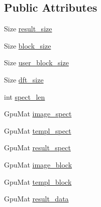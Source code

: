 \subsection*{Public Attributes}
\begin{DoxyCompactItemize}
\item 
Size \hyperlink{structcv_1_1gpu_1_1ConvolveBuf_a1fcc3ca5bfa580528118ce922b3692b7}{result\-\_\-size}
\item 
Size \hyperlink{structcv_1_1gpu_1_1ConvolveBuf_a6aef44d6f244fddaf0af4200872deacc}{block\-\_\-size}
\item 
Size \hyperlink{structcv_1_1gpu_1_1ConvolveBuf_ade057847a290ec2248bd3b2cfca3d917}{user\-\_\-block\-\_\-size}
\item 
Size \hyperlink{structcv_1_1gpu_1_1ConvolveBuf_a5593bfd0e5bd9eb4f72a3c97a77a2c63}{dft\-\_\-size}
\item 
int \hyperlink{structcv_1_1gpu_1_1ConvolveBuf_a300e36466a351f57ac879152dc38b7e0}{spect\-\_\-len}
\item 
Gpu\-Mat \hyperlink{structcv_1_1gpu_1_1ConvolveBuf_a08ae7b923567201abe7738707784961c}{image\-\_\-spect}
\item 
Gpu\-Mat \hyperlink{structcv_1_1gpu_1_1ConvolveBuf_a35ceeee1b84fbde044e518ea5237ad97}{templ\-\_\-spect}
\item 
Gpu\-Mat \hyperlink{structcv_1_1gpu_1_1ConvolveBuf_a0b81e80891c9833a4f41a62e0fff62c2}{result\-\_\-spect}
\item 
Gpu\-Mat \hyperlink{structcv_1_1gpu_1_1ConvolveBuf_a633f154c0c1bbab45bd85ec46a4ca853}{image\-\_\-block}
\item 
Gpu\-Mat \hyperlink{structcv_1_1gpu_1_1ConvolveBuf_ae6c09a39fbd299368b18a7f95de072d8}{templ\-\_\-block}
\item 
Gpu\-Mat \hyperlink{structcv_1_1gpu_1_1ConvolveBuf_aca6b0a1e8778b7b55303f5d98a2cc7e9}{result\-\_\-data}
\end{DoxyCompactItemize}


